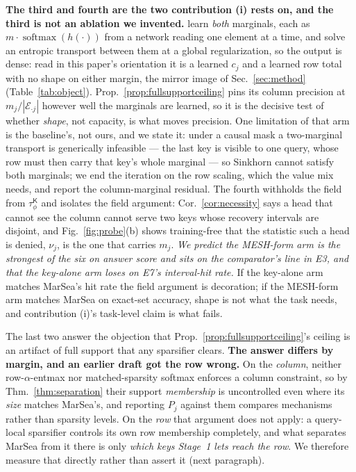 \documentclass{article}
\newcommand{\softmaxop}{\operatorname{softmax}}
\newcommand{\tauK}{\tau^{\mathsf{K}}_\phi}
\begin{document}
\textbf{The third and fourth are the two contribution (i) rests on, and the third is not an
ablation we invented.} \citet{zhang2023mesh} learn \emph{both} marginals, each as
$m\cdot\softmaxop(h(\cdot))$ from a network reading one element at a time, and solve an entropic
transport between them at a global regularization, so the output is dense: read in this paper's
orientation it is a learned $c_j$ and a learned row total with no shape on either margin, the
mirror image of Sec.~\ref{sec:method} (Table~\ref{tab:object}).
Prop.~\ref{prop:fullsupportceiling} pins its column precision at $m_j/|\mathcal{E}_{\cdot j}|$
however well the marginals are learned, so it is the decisive test of whether \emph{shape}, not
capacity, is what moves precision. One limitation of that arm is the baseline's, not ours, and we
state it: under a causal mask a two-marginal transport is generically infeasible --- the last key
is visible to one query, whose row must then carry that key's whole marginal --- so Sinkhorn
cannot satisfy both marginals; we end the iteration on the row scaling, which the value mix needs,
and report the column-marginal residual. The fourth withholds the field from $\tauK$ and isolates the
field argument: Cor.~\ref{cor:necessity} says a head that cannot see the column cannot serve two
keys whose recovery intervals are disjoint, and Fig.~\ref{fig:probe}(b) shows training-free that
the statistic such a head is denied, $\nu_j$, is the one that carries $m_j$. \emph{We predict the
MESH-form arm is the strongest of the six on answer score and sits on the comparator's line in
E3, and that the key-alone arm loses on E7's interval-hit rate.} If the key-alone arm matches
MarSea's hit rate the field argument is decoration; if the MESH-form arm matches MarSea on
exact-set accuracy, shape is not what the task needs, and contribution (i)'s task-level claim is
what fails.

The last two answer the objection that
Prop.~\ref{prop:fullsupportceiling}'s ceiling is an artifact of full support that any sparsifier
clears. \textbf{The answer differs by margin, and an earlier draft got the row wrong.} On the
\emph{column}, neither row-$\alpha$-entmax nor matched-sparsity softmax enforces a column
constraint, so by Thm.~\ref{thm:separation} their support \emph{membership} is uncontrolled even
where its \emph{size} matches MarSea's, and reporting $P_j$ against them compares mechanisms
rather than sparsity levels. On the \emph{row} that argument does not apply: a query-local
sparsifier controls its own row membership completely, and what separates MarSea from it there
is only \emph{which keys Stage~1 lets reach the row}. We therefore measure that directly rather
than assert it (next paragraph).
\end{document}
